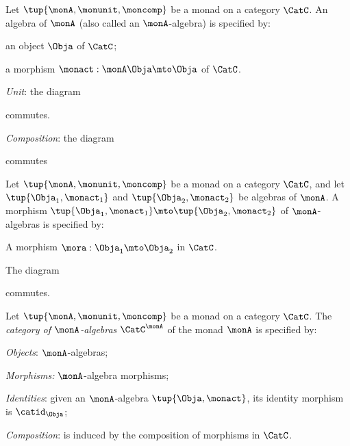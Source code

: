 \begin{ctdefinition}
Let $\tup{\monA, \monunit, \moncomp}$ be a monad on a category $\CatC$. An algebra of $\monA$ (also called an $\monA$-algebra) is specified by: \
\constit
\begin{compactenum}
\item an object $\Obja$ of $\CatC$;
\item a morphism $\monact: \monA \Obja \mto \Obja$ of $\CatC$. 
\end{compactenum}
\condit
\begin{compactenum}
\item \emph{Unit}: the diagram 
\begin{center}
  \end{center}
commutes.
\item \emph{Composition}: the diagram
\begin{center}
  \end{center}
commutes
\end{compactenum}
\end{ctdefinition}


\begin{ctdefinition}
Let $\tup{\monA, \monunit, \moncomp}$ be a monad on a category $\CatC$, and let $\tup{\Obja_1, \monact_1}$ and $\tup{\Obja_2, \monact_2}$ be algebras of $\monA$. A morphism $\tup{\Obja_1, \monact_1} \mto \tup{\Obja_2, \monact_2}$ of $\monA$-algebras is specified by:

\constit
\begin{compactenum}
\item A morphism $\mora : \Obja_1 \mto \Obja_2$ in $\CatC$.
\end{compactenum}
\condit
\begin{compactenum}
\item The diagram
\begin{center}
  \end{center}
commutes. 
\end{compactenum}
\end{ctdefinition}


\begin{ctdefinition}
Let $\tup{\monA, \monunit, \moncomp}$ be a monad on a category $\CatC$. The \emph{category of $\monA$-algebras} $\CatC^\monA$ of the monad $\monA$ is specified by:
\begin{compactenum}
\item \emph{Objects}: $\monA$-algebras;
\item \emph{Morphisms:} $\monA$-algebra morphisms;
\item \emph{Identities}: given an $\monA$-algebra $\tup{\Obja, \monact}$, its identity morphism is $\catid_\Obja$;
\item \emph{Composition}: is induced by the composition of morphisms in $\CatC$.
\end{compactenum}
\end{ctdefinition}


